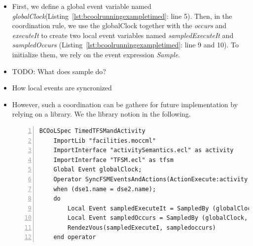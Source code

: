 \begin{itemize}
	\item First, we define a global event variable named \emph{globalClock}(Listing~\ref{lst:bcoolrunningexampletimed}: line 5). Then, in the coordination rule, we use the globalClock together with the \dse \emph{occurs} and \emph{executeIt} to create two local event variables named \emph{sampledExecuteIt} and \emph{sampledOccurs} (Listing~\ref{lst:bcoolrunningexampletimed}: line 9 and 10). To initialize them, we rely on the event expression \emph{Sample}. 
	
	\item TODO: What does sample do? 
	
	\item How local events are syncronized 
	
	\item However, such a coordination can be gathere for future implementation by relying on a library. We the library notion in the following.
	

	\begin{lstlisting}[language=bcool,
	caption={Synchronized product operator between the TFSM and Activity languages by using Event Variables},
	label={lst:bcoolrunningexampletimed}, 
	basicstyle=\scriptsize\ttfamily, backgroundcolor=\color{LGrey}, numbers=left, xleftmargin=2pt]
	BCOoLSpec TimedTFSMandActivity
	ImportLib "facilities.moccml"
	ImportInterface "activitySemantics.ecl" as activity
	ImportInterface "TFSM.ecl" as tfsm
	Global Event globalClock;
	Operator SyncFSMEventsAndActions(ActionExecute:activity::executeIt, FSMEventOccurs:tfsm::occurs)
	when (dse1.name = dse2.name);
	do
		Local Event sampledExecuteIt = SampledBy (globalClock, ActionExecute);
		Local Event sampledOccurs = SampledBy (globalClock, FSMEventOccurs);
		RendezVous(sampledExecuteI, sampledoccurs)
	end operator
	\end{lstlisting}
	

\end{itemize}
